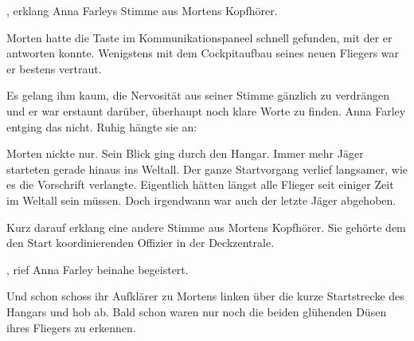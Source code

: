 \par

, erklang Anna Farleys Stimme aus Mortens Kopfhörer. 

\par

Morten hatte die Taste im Kommunikationspaneel schnell gefunden, mit der er antworten konnte. Wenigstens mit dem Cockpitaufbau seines neuen Fliegers war er bestens vertraut. 

\par

Es gelang ihm kaum, die Nervosität aus seiner Stimme gänzlich zu verdrängen und er war erstaunt darüber, überhaupt noch klare Worte zu finden. Anna Farley entging das nicht. Ruhig hängte sie an: 

\par

Morten nickte nur. Sein Blick ging durch den Hangar. Immer mehr Jäger starteten gerade hinaus ins Weltall. Der ganze Startvorgang verlief langsamer, wie es die Vorschrift verlangte. Eigentlich hätten längst alle Flieger seit einiger Zeit im Weltall sein müssen. Doch irgendwann war auch der letzte Jäger abgehoben.

\par

Kurz darauf erklang eine andere Stimme aus Mortens Kopfhörer. Sie gehörte dem den Start koordinierenden Offizier in der Deckzentrale. 

\par

, rief Anna Farley beinahe begeistert.

\par

Und schon schoss ihr Aufklärer zu Mortens linken über die kurze Startstrecke des Hangars und hob ab. Bald schon waren nur noch die beiden glühenden Düsen ihres Fliegers zu erkennen.

